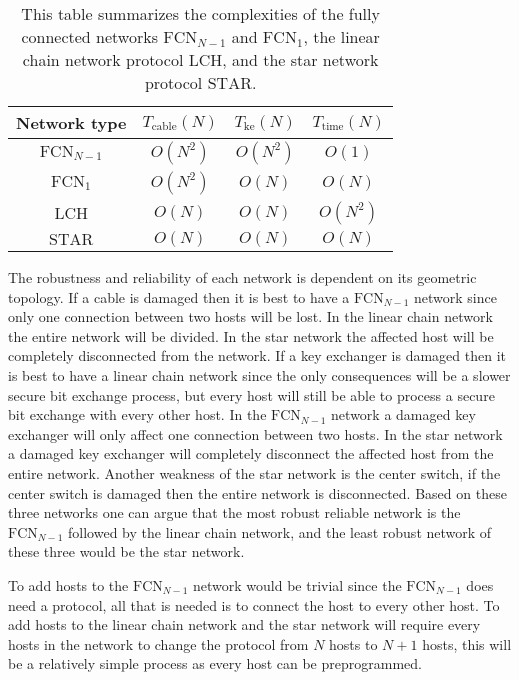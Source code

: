 \documentclass[a4paper,12pt,pdftex]{article}
\begin{document}
\begin{table}[h]
  \begin{center}
    \begin{tabular}{| c | c | c | c |}
    \hline
    Network type & $T_\mathrm{cable}(N)$ & $T_\mathrm{ke}(N)$ & $T_\mathrm{time}(N)$\\
    \hline
    $\mathrm{FCN}_{N-1}$ & $O(N^{2})$ & $O(N^{2})$ & $O(1)$ \\
    $\mathrm{FCN}_{1}$ & $O(N^{2})$ & $O(N)$ & $O(N)$ \\
    $\mathrm{LCH}$ & $O(N)$ & $O(N)$ & $O(N^{2})$ \\
    $\mathrm{STAR}$ & $O(N)$ & $O(N)$ & $O(N)$ \\
    \hline
    \end{tabular}
  \end{center}
  \caption{This table summarizes the complexities of the fully connected networks $\mathrm{FCN}_{N-1}$ and $\mathrm{FCN}_{1}$, the linear chain network protocol $\mathrm{LCH}$, and the star network protocol $\mathrm{STAR}$.}
  \label{table:comp}
\end{table}

The robustness and reliability of each network is dependent on its geometric topology. If a cable is damaged then it is best to have a $\mathrm{FCN}_{N-1}$ network since only one connection between two hosts will be lost. In the linear chain network the entire network will be divided. In the star network the affected host will be completely disconnected from the network. If a key exchanger is damaged then it is best to have a linear chain network since the only consequences will be a slower secure bit exchange process, but every host will still be able to process a secure bit exchange with every other host. In the $\mathrm{FCN}_{N-1}$ network a damaged key exchanger will only affect one connection between two hosts. In the star network a damaged key exchanger will completely disconnect the affected host from the entire network. Another weakness of the star network is the center switch, if the center switch is damaged then the entire network is disconnected. Based on these three networks one can argue that the most robust reliable network is the $\mathrm{FCN}_{N-1}$ followed by the linear chain network, and the least robust network of these three would be the star network.

To add hosts to the $\mathrm{FCN}_{N-1}$ network would be trivial since the $\mathrm{FCN}_{N-1}$ does need a protocol, all that is needed is to connect the host to every other host. To add hosts to the linear chain network and the star network will require every hosts in the network to change the protocol from $N$ hosts to $N+1$ hosts, this will be a relatively simple process as every host can be preprogrammed.
\end{document}
